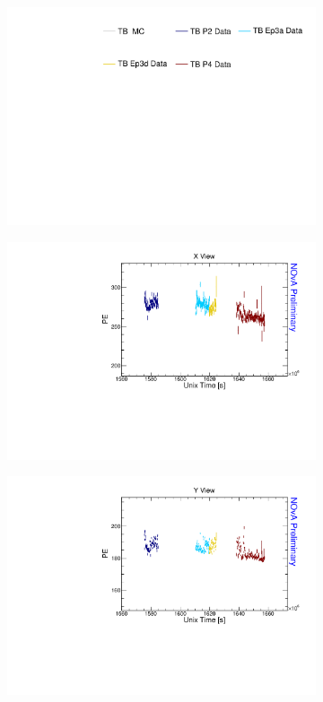 \begin{figure}[!ht]
  \begin{subfigure}{\textwidth}
    \centering
    \includegraphics[height=0.2\linewidth]{essentialsec_tb/legend.pdf}
  \end{subfigure}
  \vspace*{2mm}
  
  \begin{subfigure}{0.495\textwidth}
    \includegraphics[width=\linewidth]{driftsec_tb/pe_time_x.pdf}
  \end{subfigure}
  \begin{subfigure}{0.495\textwidth}
    \includegraphics[width=\linewidth]{driftsec_tb/pe_time_y.pdf}

\end{subfigure}
\end{figure}
